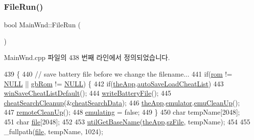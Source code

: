 \subsubsection{\texorpdfstring{File\+Run()}{FileRun()}}
{\footnotesize\ttfamily bool Main\+Wnd\+::\+File\+Run (\begin{DoxyParamCaption}{ }\end{DoxyParamCaption})}



Main\+Wnd.\+cpp 파일의 438 번째 라인에서 정의되었습니다.


\begin{DoxyCode}
439 \{
440   \textcolor{comment}{// save battery file before we change the filename...}
441   \textcolor{keywordflow}{if}(\mbox{\hyperlink{_globals_8cpp_adafc6ed627110c42f3893c9783f55320}{rom}} != \mbox{\hyperlink{getopt1_8c_a070d2ce7b6bb7e5c05602aa8c308d0c4}{NULL}} || \mbox{\hyperlink{gb_globals_8cpp_ae4f6bd8162474dbcfdbc54c36d7f5695}{gbRom}} != \mbox{\hyperlink{getopt1_8c_a070d2ce7b6bb7e5c05602aa8c308d0c4}{NULL}}) \{
442     \textcolor{keywordflow}{if}(\mbox{\hyperlink{_v_b_a_8cpp_a8095a9d06b37a7efe3723f3218ad8fb3}{theApp}}.\mbox{\hyperlink{class_v_b_a_a234d3693fb47b5ca956545eb7f9671fb}{autoSaveLoadCheatList}})
443       \mbox{\hyperlink{class_main_wnd_afd3b77fc621f2b464369c472262689ab}{winSaveCheatListDefault}}();
444     \mbox{\hyperlink{class_main_wnd_a653d11c15657ad15c35073eaf892519c}{writeBatteryFile}}();
445     \mbox{\hyperlink{_cheat_search_8cpp_a15dcda66385f7eef4240fc7868d46c8e}{cheatSearchCleanup}}(&\mbox{\hyperlink{_cheat_search_8cpp_aeeb4f5916a0f16b1bb45e57aa2cc58d4}{cheatSearchData}});
446     \mbox{\hyperlink{_v_b_a_8cpp_a8095a9d06b37a7efe3723f3218ad8fb3}{theApp}}.\mbox{\hyperlink{class_v_b_a_ab40fc008c6714c3c8670eb8a9085a4a1}{emulator}}.\mbox{\hyperlink{struct_emulated_system_ad85b1185af3fdc35c666eb4d0eb1a431}{emuCleanUp}}();
447     \mbox{\hyperlink{_main_wnd_8cpp_ad472decd8f1a11c276d8bfb3740bd8ec}{remoteCleanUp}}(); 
448     \mbox{\hyperlink{gb_globals_8h_af9cc36078b1b311753963297ae7f2a74}{emulating}} = \textcolor{keyword}{false};   
449   \}
450   \textcolor{keywordtype}{char} tempName[2048];
451   \textcolor{keywordtype}{char} \mbox{\hyperlink{expr-lex_8cpp_a702945180aa732857b380a007a7e2a21}{file}}[2048];
452   
453   \mbox{\hyperlink{_util_8cpp_a63362588317262f46bb80a2ebc63cd67}{utilGetBaseName}}(\mbox{\hyperlink{_v_b_a_8cpp_a8095a9d06b37a7efe3723f3218ad8fb3}{theApp}}.\mbox{\hyperlink{class_v_b_a_ac85720ef4e00c5455be15266b7119045}{szFile}}, tempName);
454   
455   \_fullpath(\mbox{\hyperlink{expr-lex_8cpp_a702945180aa732857b380a007a7e2a21}{file}}, tempName, 1024);

\end{DoxyCode}
